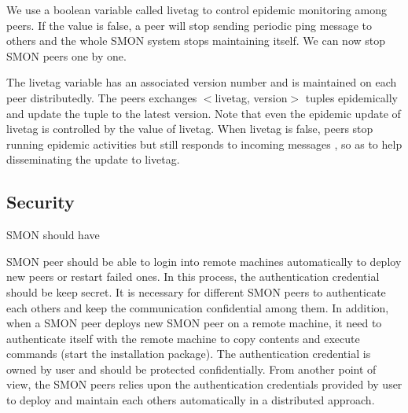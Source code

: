 We use a boolean variable called livetag to control epidemic
monitoring among peers. If the value is false, a peer will
stop sending periodic ping message to others and the whole
SMON system stops maintaining itself. We can now stop SMON
peers one by one.

The livetag variable has an associated version number and is
maintained on each peer distributedly. The peers exchanges
$<$livetag, version$>$ tuples epidemically and update the
tuple to the latest version. Note that even the epidemic
update of livetag is controlled by the value of livetag.
When livetag is false, peers stop running epidemic
activities but still responds to incoming messages
, so as to help disseminating the update to
livetag.








\subsection{Security}
\label{subsec:security}

SMON should have 

SMON peer should be able to login into remote machines
automatically to deploy new peers or restart failed ones.
In this process, the authentication credential should be
keep secret.   It is necessary for different
SMON peers to authenticate each others and keep the
communication confidential among them. In addition, when a
SMON peer deploys new SMON peer on a remote machine, it need
to authenticate itself with the remote machine to copy
contents and execute commands (start the installation
package). The authentication credential is owned by user and
should be protected confidentially. From another point of
view, the SMON peers relies upon the authentication
credentials provided by user to deploy and maintain each
others automatically in a distributed approach.

